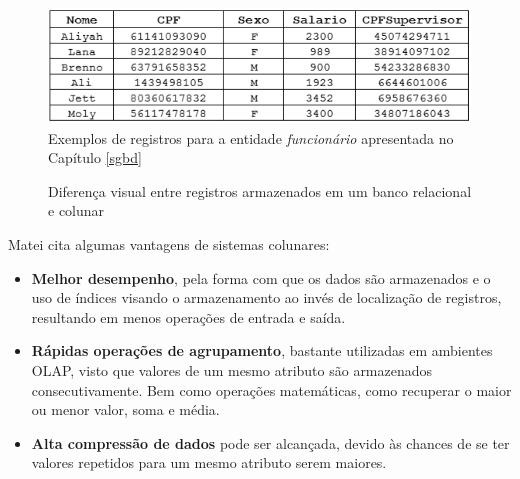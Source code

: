 
\begin{figure}[htpb]
	\centering
		\includegraphics[width=12cm]{registros}
	\caption{Exemplos de registros para a entidade \textit{funcionário} apresentada no Capítulo \ref{sgbd}}
	\label{fig:regs}
\end{figure}

\begin{figure}[htpb]
    \centering
    \caption{Diferença visual entre registros armazenados em um banco relacional e colunar}
    \label{fig:row-col}
\end{figure}

Matei \cite{matei2010column} cita algumas vantagens de sistemas colunares:

\begin{itemize}

    \item{\textbf{Melhor desempenho}}, pela forma com que os dados são armazenados e o uso de índices 
    visando o armazenamento ao invés de localização de registros, resultando em menos operações de 
    entrada e saída.
    \item{\textbf{Rápidas operações de agrupamento}}, bastante utilizadas em ambientes OLAP, visto 
    que valores de um mesmo atributo são armazenados consecutivamente. Bem como operações matemáticas, 
    como recuperar o maior ou menor valor, soma e média.
    \item{\textbf{Alta compressão de dados}} pode ser alcançada, devido às chances de se ter 
    valores repetidos para um mesmo atributo serem maiores.

\end{itemize}


